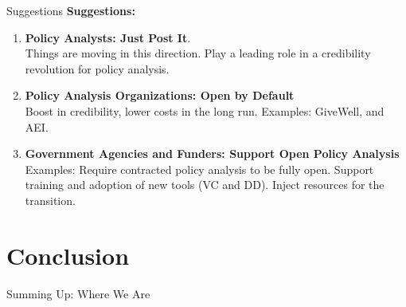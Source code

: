 \documentclass{beamer}
\begin{document}
\begin{frame}{Suggestions}
\textbf{Suggestions:}
\begin{enumerate}
\item \textbf{Policy Analysts: Just Post It}. \\
Things are moving in this direction. Play a leading role in a credibility revolution for policy analysis. 
\pause 
\item \textbf{Policy Analysis Organizations: Open by Default} \\
Boost in credibility, lower costs in the long run. Examples: GiveWell, and AEI. 
\pause 
\item \textbf{Government Agencies and Funders: Support Open Policy Analysis}
Examples: Require contracted policy analysis to be fully open. Support training and adoption of new tools (VC and DD). Inject resources for the transition.
\end{enumerate}
\end{frame} 


\section[Conclusion]{Conclusion}

\begin{frame}{Summing Up: Where We Are}
\end{frame}
\end{document}
